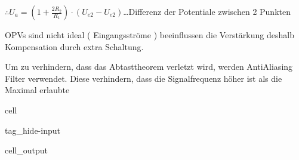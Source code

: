 \documentclass[letterpaper,10pt,english]{jupyterBook}
\begin{document}
\sphinxAtStartPar
\(\therefore U_a = \left(1 + \frac{2R_2}{R_1}\right)\cdot (U_{e2} - U_{e2})\)…Differenz der Potentiale zwischen 2 Punkten

\begin{DUlineblock}{0em}
\item[] 
\end{DUlineblock}

\sphinxAtStartPar
OPVs sind nicht ideal ( Eingangsströme ) beeinflussen die Verstärkung deshalb Kompensation durch extra Schaltung.

\begin{DUlineblock}{0em}
\item[] 
\end{DUlineblock}

\begin{DUlineblock}{0em}
\item[] 
\end{DUlineblock}

\begin{DUlineblock}{0em}
\item[] 
\end{DUlineblock}

\sphinxAtStartPar
Um zu verhindern, dass das Abtasttheorem verletzt wird, werden Anti\sphinxhyphen{}Aliasing Filter verwendet.
Diese verhindern,
dass die Signalfrequenz höher ist als die Maximal erlaubte

\begin{sphinxuseclass}{cell}
\begin{sphinxuseclass}{tag_hide-input}\begin{sphinxVerbatimOutput}

\begin{sphinxuseclass}{cell_output}
\noindent{}

\end{sphinxuseclass}\end{sphinxVerbatimOutput}

\end{sphinxuseclass}
\end{sphinxuseclass}
\begin{DUlineblock}{0em}
\item[] 
\end{DUlineblock}
\end{document}
